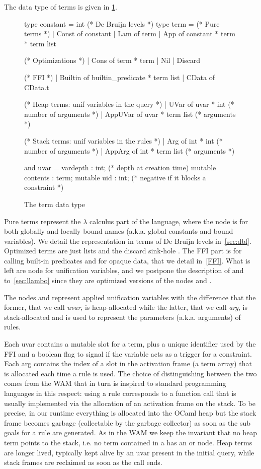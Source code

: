 \documentclass[a4paper, 11pt]{book}
\begin{document}
The data type of terms is given in \cref{fig:term}.
\begin{figure}
\begin{ocamlcode}
type constant = int (* De Bruijn levels *)
type term =
  (* Pure terms *)
  | Const of constant
  | Lam of term
  | App of constant * term * term list

  (* Optimizations *)
  | Cons of term * term
  | Nil
  | Discard

  (* FFI *)
  | Builtin of builtin_predicate * term list
  | CData of CData.t

  (* Heap terms: unif variables in the query *)
  | UVar    of uvar * int (* number of arguments *)
  | AppUVar of uvar * term list (* arguments *)

  (* Stack terms: unif variables in the rules *)
  | Arg    of int * int (* number of arguments *)
  | AppArg of int * term list (* arguments *)

and uvar = {
  vardepth : int; (* depth at creation time)
  mutable contents : term;
  mutable uid : int; (* negative if it blocks a constraint *)
}
\end{ocamlcode}
\caption{The term data type\label{fig:term}}
\end{figure}
Pure terms represent the $\lambda$ calculus part of the language, where
the  node is for both globally and locally bound names
(a.k.a. global constants and bound variables). We detail
the representation in terms of De Bruijn levels in~\cref{sec:dbl}.
Optimized terms are just lists and the discard sink-hole \elpi{_}.
The FFI part is for calling built-in predicates and for opaque data,
that we detail in~\cref{FFI}.
What is left are node for unification variables, and we postpone
the description of  and  to~\cref{sec:llambo}
since they are optimized versions of the nodes  and .

The nodes  and  represent applied unification
variables with the difference that the former, that we call \emph{uvar},
is heap-allocated while the latter, that we call \emph{arg},
is stack-allocated and is used to represent the parameters (a.k.a. arguments)
of rules.

Each uvar contains a mutable slot for a term, plus a unique identifier used
by the FFI and a boolean flag to signal if the variable acts as a trigger for a constraint.
Each arg contains the index of a slot in the activation frame (a term array)
that is allocated each time a rule is used.
The choice of distinguishing between the two comes from the WAM that in turn
is inspired to standard programming languages in this respect: using a rule
corresponds to a function call that is usually implemented via
the allocation of an activation frame on the stack.
To be precise, in our runtime everything is allocated into the OCaml heap but
the stack frame becomes garbage (collectable by the garbage collector) as
soon as the sub goals for a rule are generated. As in the WAM we keep the
invariant that no heap term points to the stack, i.e. no term contained
in a  has an  or  node.
Heap terms are longer lived, typically kept alive by an uvar present in the
initial query, while stack frames are reclaimed as soon as the call ends.
\end{document}
